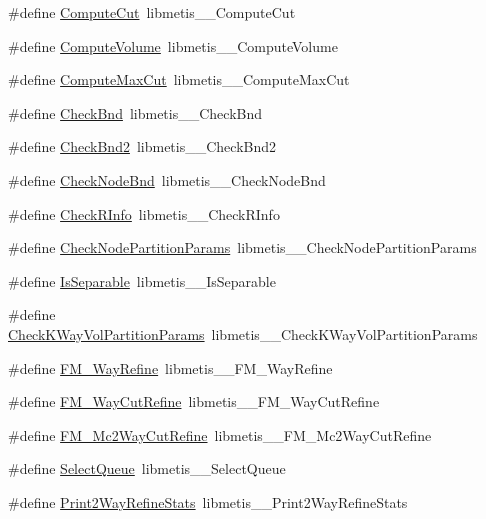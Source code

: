 \begin{DoxyCompactItemize}
\item 
\#define \hyperlink{a00957_a34baaf45a222d0422e5656d563d01753}{Compute\+Cut}~libmetis\+\_\+\+\_\+\+Compute\+Cut
\item 
\#define \hyperlink{a00957_a58a592283ae58b1527842427c46c405a}{Compute\+Volume}~libmetis\+\_\+\+\_\+\+Compute\+Volume
\item 
\#define \hyperlink{a00957_af3d188e706ff697ad426c43b260e7ce0}{Compute\+Max\+Cut}~libmetis\+\_\+\+\_\+\+Compute\+Max\+Cut
\item 
\#define \hyperlink{a00957_a8605221be98bbc60fbb1e0440ef93917}{Check\+Bnd}~libmetis\+\_\+\+\_\+\+Check\+Bnd
\item 
\#define \hyperlink{a00957_ae773a790570b03353a2383cab3e4d13d}{Check\+Bnd2}~libmetis\+\_\+\+\_\+\+Check\+Bnd2
\item 
\#define \hyperlink{a00957_aaf651cb829c5f26d14f7579a85d85b1d}{Check\+Node\+Bnd}~libmetis\+\_\+\+\_\+\+Check\+Node\+Bnd
\item 
\#define \hyperlink{a00957_a5ce9d815d224da17e63acd958eb39834}{Check\+R\+Info}~libmetis\+\_\+\+\_\+\+Check\+R\+Info
\item 
\#define \hyperlink{a00957_a4be37f1d44f4aa83be47a11ab8dd7530}{Check\+Node\+Partition\+Params}~libmetis\+\_\+\+\_\+\+Check\+Node\+Partition\+Params
\item 
\#define \hyperlink{a00957_a096f9ceb7707ab1802be68349152b896}{Is\+Separable}~libmetis\+\_\+\+\_\+\+Is\+Separable
\item 
\#define \hyperlink{a00957_ae5a1ee19377581bd03a045311c061d79}{Check\+K\+Way\+Vol\+Partition\+Params}~libmetis\+\_\+\+\_\+\+Check\+K\+Way\+Vol\+Partition\+Params
\item 
\#define \hyperlink{a00957_ad3701e7d2dc14e54ab00d79c5fb6a0e8}{F\+M\+\_\+Way\+Refine}~libmetis\+\_\+\+\_\+\+F\+M\+\_\+Way\+Refine
\item 
\#define \hyperlink{a00957_ab08154982a16e911d0c0f35a02bfba62}{F\+M\+\_\+Way\+Cut\+Refine}~libmetis\+\_\+\+\_\+\+F\+M\+\_\+Way\+Cut\+Refine
\item 
\#define \hyperlink{a00957_ab2d6b71d8a9564174f93e35836922bf6}{F\+M\+\_\+\+Mc2\+Way\+Cut\+Refine}~libmetis\+\_\+\+\_\+\+F\+M\+\_\+\+Mc2\+Way\+Cut\+Refine
\item 
\#define \hyperlink{a00957_ac698ed74ffaed5da5126a70b2131c476}{Select\+Queue}~libmetis\+\_\+\+\_\+\+Select\+Queue
\item 
\#define \hyperlink{a00957_ab5a2e3bf69b1886a6661e39ce39c0835}{Print2\+Way\+Refine\+Stats}~libmetis\+\_\+\+\_\+\+Print2\+Way\+Refine\+Stats

\end{DoxyCompactItemize}
